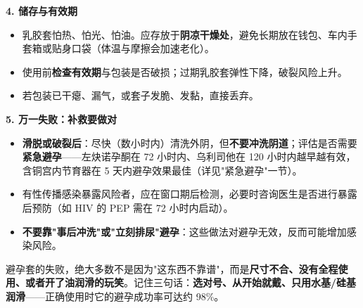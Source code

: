 \noindent\textbf{4. 储存与有效期}

\begin{itemize}
	\item 乳胶套怕热、怕光、怕油。应存放于\textbf{阴凉干燥处}，避免长期放在钱包、车内手套箱或贴身口袋（体温与摩擦会加速老化）。
	\item 使用前\textbf{检查有效期}与包装是否破损；过期乳胶套弹性下降，破裂风险上升。
	\item 若包装已干瘪、漏气，或套子发脆、发黏，直接丢弃。
\end{itemize}

\noindent\textbf{5. 万一失败：补救要做对}

\begin{itemize}
	\item \textbf{滑脱或破裂后}：尽快（数小时内）清洗外阴，但\textbf{不要冲洗阴道}；评估是否需要\textbf{紧急避孕}——左炔诺孕酮在 72 小时内、乌利司他在 120 小时内越早越有效，含铜宫内节育器在 5 天内避孕效果最佳（详见"紧急避孕"一节）。
	\item 有性传播感染暴露风险者，应在窗口期后检测，必要时咨询医生是否进行暴露后预防（如 HIV 的 PEP 需在 72 小时内启动）。
	\item \textbf{不要靠"事后冲洗"或"立刻排尿"避孕}：这些做法对避孕无效，反而可能增加感染风险。
\end{itemize}

\begin{tcolorbox}[colback=pink!5!white,colframe=red!50!black,title=贴心小叮咛]
避孕套的失败，绝大多数不是因为"这东西不靠谱"，而是\textbf{尺寸不合、没有全程使用、或者开了油润滑的玩笑}。记住三句话：\textbf{选对号、从开始就戴、只用水基/硅基润滑}——正确使用时它的避孕成功率可达约 98\%。
\end{tcolorbox}
